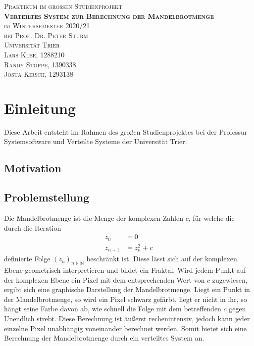 \documentclass[12pt, onecolumn, notitlepage]{scrartcl}
\begin{document}
\renewcommand{\figurename}{Abb.} 


\thispagestyle{empty}
\vspace*{7cm}
\begin{center}
	\Large{
		\textsc{
			Praktikum im großen Studienprojekt \\ [1em]
			\textbf{Verteiltes System zur Berechnung der Mandelbrotmenge} \\ [1em]
			im Wintersemester 2020/21 \\
			bei Prof. Dr. Peter Sturm \\ [1em]
			Universität Trier \\ [1em]
			Lars Klee, 1288210 \\
			Randy Stoppe, 1390338 \\
			Josua Kirsch, 1293138
		}
	}
\end{center}
\setcounter{page}{0}
\newpage

\newpage
	\tableofcontents
\newpage
{}


\section{Einleitung}
Diese Arbeit entsteht im Rahmen des großen Studienprojektes bei der Professur Systemsoftware und Verteilte Systeme der Universität Trier.
\subsection{Motivation}
\subsection{Problemstellung}
Die Mandelbrotmenge ist die Menge der komplexen Zahlen $c$, für welche die durch die Iteration \begin{align*}
z_{ 0 } &= 0  \\
z_{ n+1 } &= z_{ n }^{ 2 } + c
\end{align*}
definierte Folge $(z_{ n })_{ n\in \mathbb{N} }$ beschränkt ist. Diese lässt sich auf der komplexen Ebene geometrisch interpretieren und bildet ein Fraktal. Wird jedem Punkt auf der komplexen Ebene ein Pixel mit dem entsprechenden Wert von $c$ zugewiesen, ergibt sich eine graphische Darstellung der Mandelbrotmenge. Liegt ein Punkt in der Mandelbrotmenge, so wird ein Pixel schwarz gefärbt, liegt er nicht in ihr, so hängt seine Farbe davon ab, wie schnell die Folge mit dem betreffenden $c$ gegen Unendlich strebt. Diese Berechnung ist äußerst rechenintensiv, jedoch kann jeder einzelne Pixel unabhängig voneinander berechnet werden. Somit bietet sich eine Berechnung der Mandelbrotmenge durch ein verteiltes System an.
\end{document}
